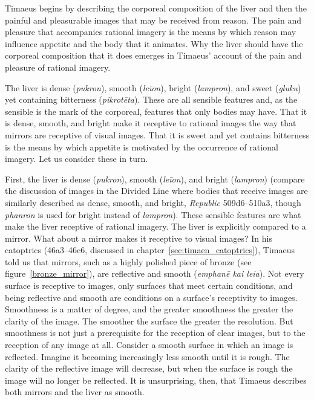 Timaeus begins by describing the corporeal composition of the liver and then the painful and pleasurable images that may be received from reason. The pain and pleasure that accompanies rational imagery is the means by which reason may influence appetite and the body that it animates. Why the liver should have the corporeal composition that it does emerges in Timaeus' account of the pain and pleasure of rational imagery.

The liver is dense (\emph{pukron}), smooth (\emph{leīon}), bright (\emph{lampron}), and sweet (\emph{gluku}) yet containing bitterness (\emph{pikrotēta}). These are all sensible features and, as the sensible is the mark of the corporeal, features that only bodies may have. That it is dense, smooth, and bright make it receptive to rational images the way that mirrors are receptive of visual images. That it is sweet and yet contains bitterness is the means by which appetite is motivated by the occurrence of rational imagery. Let us consider these in turn.

First, the liver is dense (\emph{pukron}), smooth (\emph{leīon}), and bright (\emph{lampron}) (compare the discussion of images in the Divided Line where bodies that receive images are similarly described as dense, smooth, and bright, \emph{Republic} 509d6--510a3, though \emph{phanron} is used for bright instead of \emph{lampron}). These sensible features are what make the liver receptive of rational imagery. The liver is explicitly compared to a mirror. What about a mirror makes it receptive to visual images? In his catoptrics (46a3–46c6, discussed in chapter~\ref{sec:timaen_catoptrics}), Timaeus told us that mirrors, such as a highly polished piece of bronze (see figure~\ref{bronze_mirror}), are reflective and smooth (\emph{emphanē kai leia}). Not every surface is receptive to images, only surfaces that meet certain conditions, and being reflective and smooth are conditions on a surface's receptivity to images. Smoothness is a matter of degree, and the greater smoothness the greater the clarity of the image. The smoother the surface the greater the resolution. But smoothness is not just a prerequisite for the reception of clear images, but to the reception of any image at all. Consider a smooth surface in which an image is reflected. Imagine it becoming increasingly less smooth until it is rough. The clarity of the reflective image will decrease, but when the surface is rough the image will no longer be reflected. It is unsurprising, then, that Timaeus describes both mirrors and the liver as smooth. 

